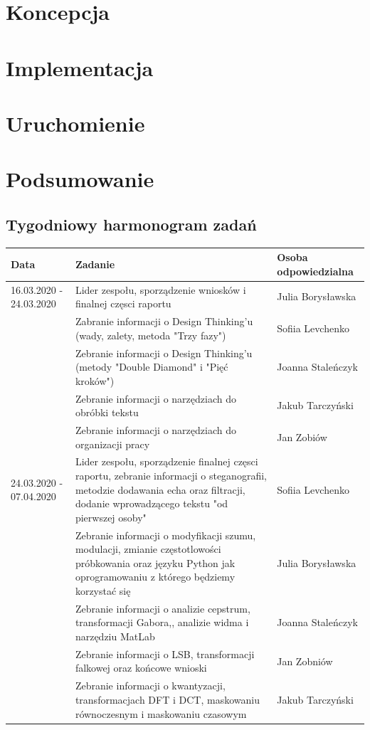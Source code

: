 \documentclass[a4paper,titleauthor]{mwart}
\begin{document}
	\section{Koncepcja}
	\label{sec:koncepcja}
	
	\section{Implementacja}
	\label{sec:implementacja}
	
	
	\section{Uruchomienie}
	\label{sec:uruchomienie}
	
	
	\section{Podsumowanie}
	\label{sec:podsumowanie}
	
	\subsection{Tygodniowy harmonogram zadań}
	
	
	
	\begin{tabular}{|p{2cm}|p{9cm}|p{3.5cm}|} \hline
		Data & Zadanie & Osoba odpowiedzialna \\
		\hline
		16.03.2020 - 24.03.2020 & Lider zespołu, sporządzenie wniosków  i finalnej częsci raportu & Julia Borysławska \\
		\hline
		& Zabranie informacji o Design Thinking'u (wady, zalety, metoda "Trzy fazy") & Sofiia Levchenko\\
		\hline
		& Zebranie informacji o Design Thinking'u (metody "Double Diamond" i "Pięć kroków") & Joanna Staleńczyk \\
		\hline
		& Zebranie informacji o narzędziach do obróbki tekstu & Jakub Tarczyński \\
		\hline
		& Zebranie informacji o narzędziach do organizacji pracy  & Jan Zobiów \\ 
		\hline
		24.03.2020 - 07.04.2020 & Lider zespołu, sporządzenie finalnej częsci raportu, zebranie informacji o steganografii, metodzie dodawania echa oraz filtracji, dodanie wprowadzącego tekstu "od pierwszej osoby" & Sofiia Levchenko\\
		\hline
		&Zebranie informacji o modyfikacji szumu, modulacji, zmianie częstotlowości próbkowania oraz języku Python jak oprogramowaniu z którego będziemy korzystać się &Julia Borysławska\\
		\hline
		&Zebranie informacji o analizie cepstrum, transformacji Gabora,, analizie widma i narzędziu MatLab &Joanna Staleńczyk\\
		\hline
		&Zebranie informacji o LSB, transformacji falkowej oraz końcowe wnioski &Jan Zobniów \\
		\hline
		&Zebranie informacji o kwantyzacji, transformacjach DFT i DCT, maskowaniu równoczesnym i maskowaniu czasowym &Jakub Tarczyński\\
		\hline
		
	\end{tabular}
	
\end{document}
